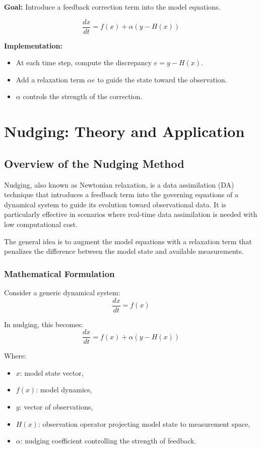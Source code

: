 \documentclass[a4paper]{article}
\begin{document}
\textbf{Goal:} Introduce a feedback correction term into the model equations.

\[
\frac{dx}{dt} = f(x) + \alpha (y - H(x))
\]

\textbf{Implementation:}
\begin{itemize}
  \item At each time step, compute the discrepancy $e = y - H(x)$.
  \item Add a relaxation term $\alpha e$ to guide the state toward the observation.
  \item $\alpha$ controls the strength of the correction.
\end{itemize}


\section{Nudging: Theory and Application}

\subsection{Overview of the Nudging Method}

Nudging, also known as Newtonian relaxation, is a data assimilation (DA) technique that introduces a feedback term into the governing equations of a dynamical system to guide its evolution toward observational data. It is particularly effective in scenarios where real-time data assimilation is needed with low computational cost.

The general idea is to augment the model equations with a relaxation term that penalizes the difference between the model state and available measurements.

\subsubsection*{Mathematical Formulation}

Consider a generic dynamical system:
\[
\frac{dx}{dt} = f(x)
\]

In nudging, this becomes:
\[
\frac{dx}{dt} = f(x) + \alpha (y - H(x))
\]

Where:
\begin{itemize}
  \item $x$: model state vector,
  \item $f(x)$: model dynamics,
  \item $y$: vector of observations,
  \item $H(x)$: observation operator projecting model state to measurement space,
  \item $\alpha$: nudging coefficient controlling the strength of feedback.
\end{itemize}
\end{document}
